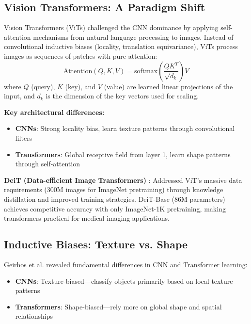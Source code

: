 \subsection{Vision Transformers: A Paradigm Shift}

Vision Transformers (ViTs) \cite{dosovitskiy2021image} challenged the CNN dominance by applying self-attention mechanisms from natural language processing to images. Instead of convolutional inductive biases (locality, translation equivariance), ViTs process images as sequences of patches with pure attention:
\begin{equation}
\text{Attention}(Q, K, V) = \text{softmax}\left(\frac{QK^T}{\sqrt{d_k}}\right)V
\end{equation}
where $Q$ (query), $K$ (key), and $V$ (value) are learned linear projections of the input, and $d_k$ is the dimension of the key vectors used for scaling.

\textbf{Key architectural differences:}
\begin{itemize}
    \item \textbf{CNNs}: Strong locality bias, learn texture patterns through convolutional filters
    \item \textbf{Transformers}: Global receptive field from layer 1, learn shape patterns through self-attention
\end{itemize}

\textbf{DeiT (Data-efficient Image Transformers)} \cite{touvron2021training}: Addressed ViT's massive data requirements (300M images for ImageNet pretraining) through knowledge distillation and improved training strategies. DeiT-Base (86M parameters) achieves competitive accuracy with only ImageNet-1K pretraining, making transformers practical for medical imaging applications.

\subsection{Inductive Biases: Texture vs. Shape}

Geirhos et al. \cite{geirhos2019imagenet} revealed fundamental differences in CNN and Transformer learning:
\begin{itemize}
    \item \textbf{CNNs}: Texture-biased—classify objects primarily based on local texture patterns
    \item \textbf{Transformers}: Shape-biased—rely more on global shape and spatial relationships
\end{itemize}

